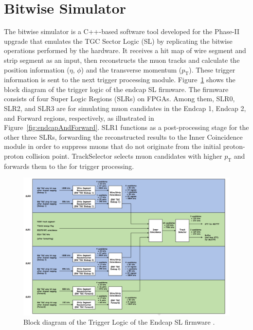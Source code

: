 \section{Bitwise Simulator} \label{sec:BitwiseSimulator}
The bitwise simulator is a C++-based software tool developed for the Phase-II upgrade that emulates the TGC Sector Logic (SL) by replicating the bitwise operations performed by the hardware. It receives a hit map of wire segment and strip segment as an input, then reconstructs the muon tracks and calculate the position information ($\eta$, $\phi$) and the transverse momentum ($p_\mathrm{T}$). These trigger information is sent to the next trigger processing module. Figure~\ref{fig:blockDiagram} shows the block diagram of the trigger logic of the endcap SL firmware. The firmware consists of four Super Logic Regions (SLRs) on FPGAs. Among them, SLR0, SLR2, and SLR3 are for simulating muon candidates in the Endcap 1, Endcap 2, and Forward regions, respectively, as illustrated in Figure~\ref{fig:endcapAndForward}. SLR1 functions as a post-processing stage for the other three SLRs, forwarding the reconstructed results to the Inner Coincidence module in order to suppress muons that do not originate from the initial proton-proton collision point.
TrackSelector selects muon candidates with higher $p_\mathrm{T}$ and forwards them to the \MUCTPI for trigger processing.
\begin{figure}
  \centering
  \includegraphics[width=1.0\textwidth]{figs/chapter5/block_diagram_of_trigger_logic.png}
  \caption{Block diagram of the Trigger Logic of the Endcap SL firmware \cite{EndcapSLPDR}.}
  \label{fig:blockDiagram}
\end{figure}

